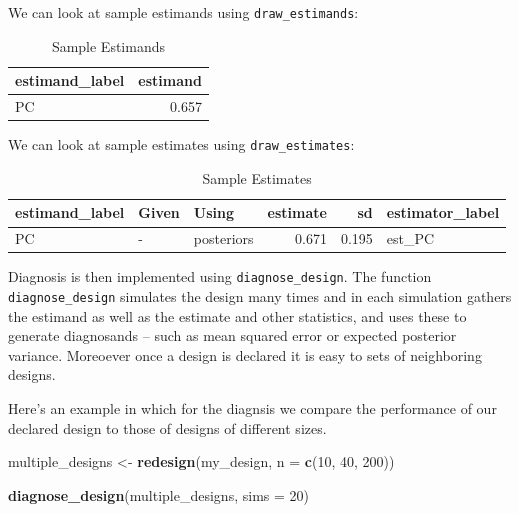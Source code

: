 \documentclass[
  12pt,
]{book}
\newenvironment{Shaded}{\begin{snugshade}}{\end{snugshade}}
\newcommand{\DataTypeTok}[1]{\textcolor[rgb]{0.13,0.29,0.53}{#1}}
\newcommand{\DecValTok}[1]{\textcolor[rgb]{0.00,0.00,0.81}{#1}}
\newcommand{\KeywordTok}[1]{\textcolor[rgb]{0.13,0.29,0.53}{\textbf{#1}}}
\newcommand{\NormalTok}[1]{#1}
\newcommand{\StringTok}[1]{\textcolor[rgb]{0.31,0.60,0.02}{#1}}
\begin{document}
We can look at sample estimands using \texttt{draw\_estimands}:

\begin{table}

\caption{\label{tab:estimands}Sample Estimands}
\centering
\begin{tabular}[t]{l|r}
\hline
estimand\_label & estimand\\
\hline
PC & 0.657\\
\hline
\end{tabular}
\end{table}

We can look at sample estimates using \texttt{draw\_estimates}:

\begin{table}

\caption{\label{tab:estimates}Sample Estimates}
\centering
\begin{tabular}[t]{l|l|l|r|r|l}
\hline
estimand\_label & Given & Using & estimate & sd & estimator\_label\\
\hline
PC & - & posteriors & 0.671 & 0.195 & est\_PC\\
\hline
\end{tabular}
\end{table}

Diagnosis is then implemented using \texttt{diagnose\_design}. The function \texttt{diagnose\_design} simulates the design many times and in each simulation gathers the estimand as well as the estimate and other statistics, and uses these to generate diagnosands -- such as mean squared error or expected posterior variance. Moreoever once a design is declared it is easy to sets of neighboring designs.

Here's an example in which for the diagnsis we compare the performance of our declared design to those of designs of different sizes.

\begin{Shaded}
\begin{Highlighting}[]
\NormalTok{multiple_designs <-}\StringTok{ }\KeywordTok{redesign}\NormalTok{(my_design, }\DataTypeTok{n =} \KeywordTok{c}\NormalTok{(}\DecValTok{10}\NormalTok{, }\DecValTok{40}\NormalTok{, }\DecValTok{200}\NormalTok{))}

\KeywordTok{diagnose_design}\NormalTok{(multiple_designs, }\DataTypeTok{sims =} \DecValTok{20}\NormalTok{)}
\end{Highlighting}
\end{Shaded}
\end{document}

